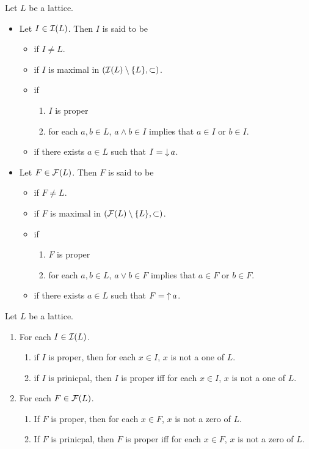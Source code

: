 \documentclass{book}
\begin{document}
	
	\begin{defn}
		Let $L$ be a lattice.
		\begin{itemize}
			\item Let $I \in \mathcal{I}(L)$. Then $I$ is said to be 
			\begin{itemize}
				\item {} if $I \neq L$. 
				\item {} if $I$ is maximal in $(\mathcal{I}(L) \setminus \{L\}, \subset)$. 
				\item {} if 
				\begin{enumerate}
					\item $I$ is proper 
					\item for each $a,b \in L$, $a \wedge b \in I$ implies that $a \in I$ or $b \in I$. 
				\end{enumerate}
				\item {} if there exists $a \in L$ such that $I = \operatorname{\downarrow} a$.
			\end{itemize}
			\item Let $F \in \mathcal{F}(L)$. Then $F$ is said to be 
			\begin{itemize}
				\item {} if $F \neq L$. 
				\item {} if $F$ is maximal in $(\mathcal{F}(L) \setminus \{L\}, \subset)$. 
				\item {} if 
				\begin{enumerate}
					\item $F$ is proper 
					\item for each $a,b \in L$, $a \vee b \in F$ implies that $a \in F$ or $b \in F$.
				\end{enumerate}
				\item {} if there exists $a \in L$ such that $F = \operatorname{\uparrow} a$. 
			\end{itemize}
		\end{itemize}
	\end{defn}
	
	\begin{ex}
		Let $L$ be a lattice.
		\begin{enumerate}
			\item For each $I \in \mathcal{I}(L)$. 
			\begin{enumerate}
				\item if $I$ is proper, then for each $x \in I$, $x$ is not a one of $L$.
				\item if $I$ is prinicpal, then $I$ is proper iff for each $x \in I$, $x$ is not a one of $L$.
			\end{enumerate}
			\item For each $F \in \mathcal{F}(L)$. 
			\begin{enumerate}
				\item If $F$ is proper, then for each $x \in F$, $x$ is not a zero of $L$.
				\item If $F$ is prinicpal, then $F$ is proper iff for each $x \in F$, $x$ is not a zero of $L$.
			\end{enumerate}
		\end{enumerate}
	\end{ex}
	
\end{document}
